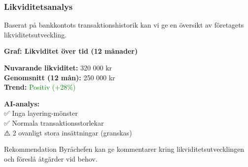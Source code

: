 \documentclass[10pt]{beamer}
\begin{document}
\begin{frame}[label=likviditet]
  \frametitle{Likviditetsanalys}
  \small
  Baserat på bankkontots transaktionshistorik kan vi ge en översikt av företagets likviditetsutveckling.
  
  \vspace{0.5cm}
  \begin{center}
    \textbf{Graf: Likviditet över tid (12 månader)}\\
    \vspace{0.3cm}
  \end{center}
  
  \vspace{0.5cm}
  \begin{minipage}{0.48\textwidth}
    \textbf{Nuvarande likviditet:} 320 000 kr\\
    \textbf{Genomsnitt (12 mån):} 250 000 kr\\
    \textbf{Trend:} \textcolor{green}{Positiv (+28\%)}
  \end{minipage}
  \hfill
  \begin{minipage}{0.48\textwidth}
    \textbf{AI-analys:}\\
    \footnotesize
    ✅ Inga layering-mönster\\
    ✅ Normala transaktionsstorlekar\\
    ⚠️ 2 ovanligt stora insättningar (granskas)
  \end{minipage}
  
  \vspace{0.5cm}
  \begin{block}{Rekommendation}
    Byråchefen kan ge kommentarer kring likviditetsutvecklingen och föreslå åtgärder vid behov.
  \end{block}
  
  \vspace{0.5cm}
  \begin{flushright}
    \hyperlink{nextslide}{}
  \end{flushright}
\end{frame}
\end{document}
